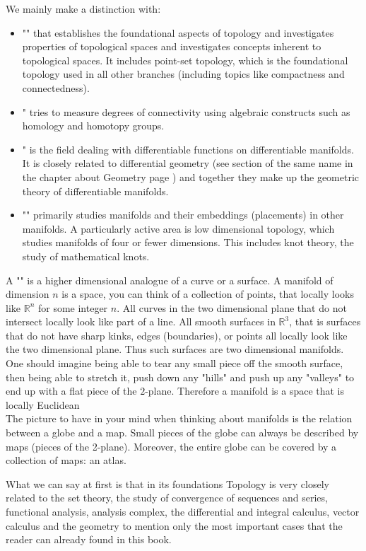 We mainly make a distinction with:
	\begin{itemize}
		\item "" that establishes the foundational aspects of topology and investigates properties of topological spaces and investigates concepts inherent to topological spaces. It includes point-set topology, which is the foundational topology used in all other branches (including topics like compactness and connectedness).
		
		\item " tries to measure degrees of connectivity using algebraic constructs such as homology and homotopy groups.
		\item " is the field dealing with differentiable functions on differentiable manifolds. It is closely related to differential geometry (see section of the same name in the chapter about Geometry page \pageref{differential geometry}) and together they make up the geometric theory of differentiable manifolds.
		\item "" primarily studies manifolds and their embeddings (placements) in other manifolds. A particularly active area is low dimensional topology, which studies manifolds of four or fewer dimensions. This includes knot theory, the study of mathematical knots.	
	\end{itemize}
	\begin{tcolorbox}[title=Remark,colframe=black,arc=10pt]
	A "" is a higher dimensional analogue of a curve or a surface. A manifold of dimension $n$ is a space, you can think of a collection of points, that locally looks like $\mathbb{R}^{n}$ for some integer $n$. All curves in the two dimensional plane that do not intersect locally look like part of a line. All smooth surfaces in $\mathbb{R}^3$, that is surfaces that do not have sharp kinks, edges (boundaries), or points all locally look like the two dimensional plane. Thus such surfaces are two dimensional manifolds. One should imagine being able to tear any small piece off the smooth surface, then being able to stretch it, push down any "hills" and push up any "valleys" to end up with a flat piece of the $2$-plane. Therefore a manifold is a space that is locally Euclidean\\
	
	The picture to have in your mind when thinking about manifolds is the relation between a globe and a map. Small pieces of the globe can always be described by maps (pieces of the 2-plane). Moreover, the entire globe can be covered by a collection of maps: an atlas.
	\end{tcolorbox}
	What we can say at first is that in its foundations Topology is very closely related to the set theory, the study of convergence of sequences and series, functional analysis, analysis complex, the differential and integral calculus, vector calculus and the geometry to mention only the most important cases that the reader can already found in this book.

